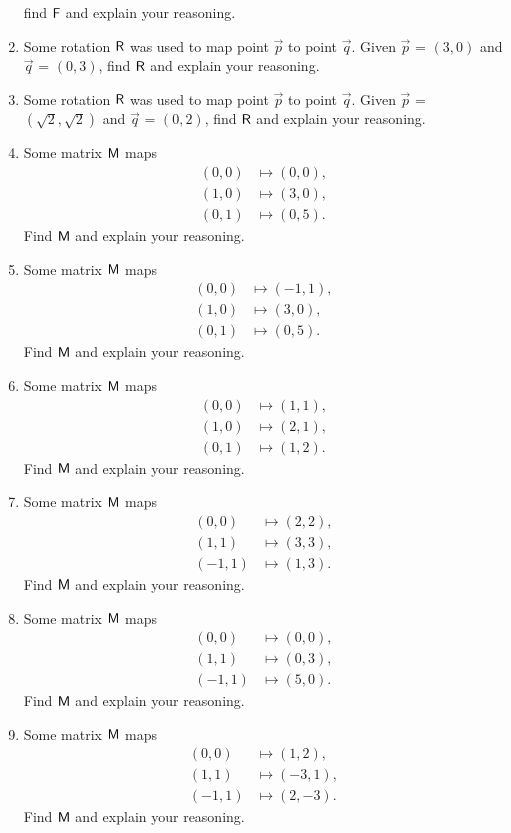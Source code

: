 \begin{problems}
\begin{enumerate}
  find $\mathsf{F}$ and explain your reasoning.
\item Some rotation $\mathsf{R}$ was used to map point $\vec{p}$ to point
  $\vec{q}$.  Given $\vec{p}$ = $(3,0)$ and $\vec{q}$ = $(0,3)$, find
  $\mathsf{R}$ and explain your reasoning.
\item Some rotation $\mathsf{R}$ was used to map point $\vec{p}$ to point
  $\vec{q}$.  Given $\vec{p}$ = $(\sqrt{2},\sqrt{2})$ and $\vec{q}$ =
  $(0,2)$, find $\mathsf{R}$ and explain your reasoning.
\item Some matrix $\mathsf{M}$ maps 
\begin{align*}
(0,0) &\mapsto (0,0), \\
(1,0) &\mapsto (3,0), \\
(0,1) &\mapsto (0,5).
\end{align*}
Find $\mathsf{M}$ and explain your reasoning.
\item Some matrix $\mathsf{M}$ maps 
\begin{align*}
(0,0) &\mapsto (-1,1), \\
(1,0) &\mapsto (3,0), \\
(0,1) &\mapsto (0,5).
\end{align*}
Find $\mathsf{M}$ and explain your reasoning.
\item Some matrix $\mathsf{M}$ maps 
\begin{align*}
(0,0) &\mapsto (1,1), \\
(1,0) &\mapsto (2,1), \\
(0,1) &\mapsto (1,2).
\end{align*}
Find $\mathsf{M}$ and explain your reasoning.
\item Some matrix $\mathsf{M}$ maps 
\begin{align*}
(0,0) &\mapsto (2,2), \\
(1,1) &\mapsto (3,3), \\
(-1,1) &\mapsto (1,3).
\end{align*}
Find $\mathsf{M}$ and explain your reasoning.
\item Some matrix $\mathsf{M}$ maps 
\begin{align*}
(0,0) &\mapsto (0,0), \\
(1,1) &\mapsto (0,3), \\
(-1,1) &\mapsto (5,0).
\end{align*}
Find $\mathsf{M}$ and explain your reasoning.
\item Some matrix $\mathsf{M}$ maps 
\begin{align*}
(0,0) &\mapsto (1,2), \\
(1,1) &\mapsto (-3,1), \\
(-1,1) &\mapsto (2,-3).
\end{align*}
Find $\mathsf{M}$ and explain your reasoning.


\end{enumerate}
\end{problems}

